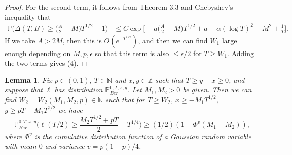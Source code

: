 \documentclass[12pt]{article}
\newtheorem{lemma}{Lemma}
\begin{document}
\begin{proof}
		For the second term, it follows from Theorem 3.3 and Chebyshev's inequality that
		\begin{align*}
		\mathbb{P}\Big(\Delta(T,B) \geq \Big(\frac{A}{2} - M\Big)T^{1/2} - 1\Big) &\leq C\exp\Big[-a\Big(\frac{A}{2}- M\Big)T^{1/2} + a + \alpha(\log T)^2 + M^2 + \frac{1}{T}\Big].
		\end{align*}
		If we take $A > 2M$, then this is $O(e^{-T^{1/2}})$, and then we can find $W_1$ large enough depending on $M,p,\epsilon$ so that this term is also $\leq\epsilon/2$ for $T\geq W_1$. Adding the two terms gives (4).
		
	\end{proof}

	\begin{lemma}\label{LemmaTailS4}Fix $p \in (0,1)$, $T \in \mathbb{N}$ and $x, y\in \mathbb{Z}$ such that $T \geq y-x \geq 0$, and suppose that $\ell$ has distribution $\mathbb{P}^{0,T,x,y}_{Ber}$. Let $M_1,M_2 > 0$ be given. Then we can find $W_2 = W_2(M_1,M_2,p) \in \mathbb{N}$ such that for $T \geq W_2$, $ x \geq -M_1T^{1/2}$, $ y \geq pT -  M_1T^{1/2}$ we have
		\begin{equation}\label{halfEq2S4}
		\mathbb{P}^{0,T,x,y}_{Ber}\bigg( \ell( T/2 )  \geq \frac{M_2T^{1/2} + p T}{2} - T^{1/4} \bigg) \geq (1/2) (1 - \Phi^{v}(M_1 + M_2) ),
		\end{equation}
		where $\Phi^{v}$ is the cumulative distribution function  of a Gaussian random variable with mean $0$ and variance $v = p(1-p)/4$.
	\end{lemma}
	
\end{document}
